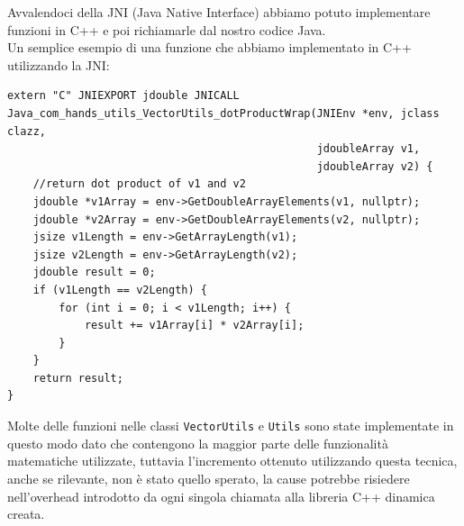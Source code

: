 \noindent
Avvalendoci della JNI (Java Native Interface) abbiamo potuto implementare funzioni in C++ e poi richiamarle dal nostro codice Java.\\

\noindent
Un semplice esempio di una funzione che abbiamo implementato in C++ utilizzando la JNI:
\begin{verbatim}
extern "C" JNIEXPORT jdouble JNICALL
Java_com_hands_utils_VectorUtils_dotProductWrap(JNIEnv *env, jclass clazz,
                                                jdoubleArray v1,
                                                jdoubleArray v2) {
    //return dot product of v1 and v2
    jdouble *v1Array = env->GetDoubleArrayElements(v1, nullptr);
    jdouble *v2Array = env->GetDoubleArrayElements(v2, nullptr);
    jsize v1Length = env->GetArrayLength(v1);
    jsize v2Length = env->GetArrayLength(v2);
    jdouble result = 0;
    if (v1Length == v2Length) {
        for (int i = 0; i < v1Length; i++) {
            result += v1Array[i] * v2Array[i];
        }
    }
    return result;
}
\end{verbatim}

Molte delle funzioni nelle classi \texttt{VectorUtils} e \texttt{Utils} sono state implementate in questo modo dato che contengono la maggior parte delle funzionalità matematiche utilizzate, tuttavia l'incremento ottenuto utilizzando questa tecnica, anche se rilevante, non è stato quello sperato, la cause potrebbe risiedere nell'overhead introdotto da ogni singola chiamata alla libreria C++ dinamica creata.
